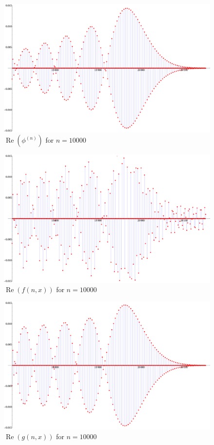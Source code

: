 \documentclass{article}
\theoremstyle{theorem}
\theoremstyle{remark}
\renewcommand\Re{\operatorname{Re}}%
\begin{document}
\begin{figure}[h!]
\centering\includegraphics[width=5in]{ex3simulation.eps}
\caption{ $\Re(\phi^{(n)})$ for $n=10000$}
\label{fig:ex3simulation}
\end{figure}
\begin{figure}[h!]
\centering\includegraphics[width=5in]{ex3twoairy.eps}
\caption{ $\Re(f(n,x))$ for $n=10000$}
\label{fig:ex3twoairy}
\end{figure}
\begin{figure}[h!]
\centering\includegraphics[width=5in]{ex3oneairy.eps}
\caption{$\Re(g(n,x))$ for $n=10000$}
\label{fig:ex3oneairy}
\end{figure}
\end{document}
